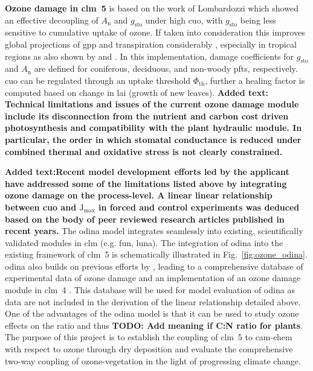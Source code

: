 \textbf{Ozone damage in \gls{clm}~5} is based on the work of Lombardozzi \textcite{Oe:Lombardozzi2012} which showed an effective decoupling of $A_\mathrm{n}$ and $g_\mathrm{sto}$ under high \gls{cuo}, with $g_\mathrm{sto}$ being less sensitive to cumulative uptake of ozone. If taken into consideration this improves global projections of \gls{gpp} and transpiration considerably \parencite{BGS:Lombardozzi2012}, especially in tropical regions as also shown by \textcite{Nat:Sitch2007} and \textcite{ACP:Pacifico2015}. In this implementation, damage coefficients for $g_\mathrm{sto}$ and $A_\mathrm{n}$ are defined for coniferous, deciduous, and non-woody \glspl{pft}, respectively. \gls{cuo} can be regulated through an uptake threshold $\Phi_\mathrm{th}$, further a healing factor is computed based on change in \gls{lai} (growth of new leaves). \textbf{\color{blue}Added text: Technical limitations and issues of the current ozone damage module include its disconnection from the nutrient and carbon cost driven photosynthesis and compatibility with the plant hydraulic module. In particular, the order in which stomatal conductance is reduced under combined thermal and oxidative stress is not clearly constrained.} 

\textbf{\color{blue}Added text:Recent model development efforts led by the applicant have addressed some of the limitations listed above by integrating ozone damage on the process-level. A linear linear relationship between \gls{cuo} and $\mathrm{J_{max}}$ in forced and control experiments was deduced based on the body of peer reviewed research articles published in recent years.} The \gls{odina} model integrates seamlessly into existing, scientifically validated modules in \gls{clm} (e.g. \gls{fun}, \gls{luna}). The integration of \gls{odina} into the existing framework of \gls{clm}~5 is schematically illustrated in Fig.~\ref{fig:ozone_odina}. \gls{odina} also builds on previous efforts by \textcites{BGS:Lombardozzi2012}{Oe:Lombardozzi2012}, leading to a comprehensive database of experimental data of ozone damage and an implementation of an ozone damage module in \gls{clm}~4 \parencite{BGS:Lombardozzi2013}. This database will be used for model evaluation of \gls{odina} as data are not included in the derivation of the linear relationship detailed above. One of the advantages of the \gls{odina} model is that it can be used to study ozone effects on the  ratio and thus \textbf{\color{red}TODO: Add meaning if C:N ratio for plants}. The purpose of this project is to establish the coupling of \gls{clm}~5 to \gls{cam}-chem with respect to ozone through dry deposition and evaluate the comprehensive two-way coupling of ozone-vegetation in the light of progressing climate change.

